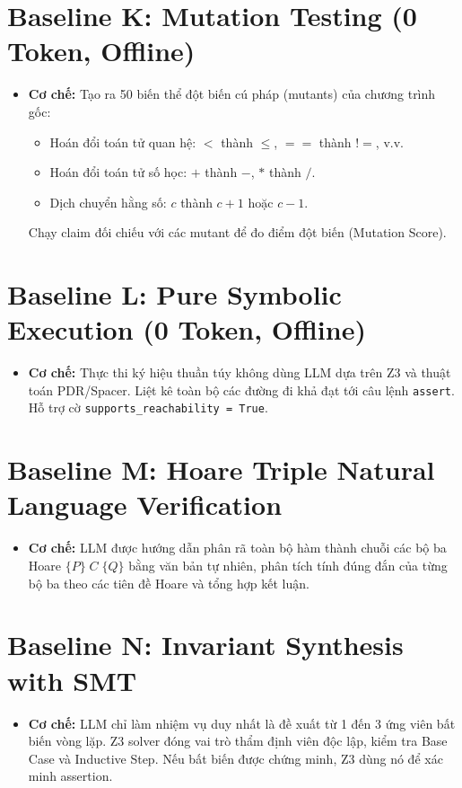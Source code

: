 \section{Baseline K: Mutation Testing (0 Token, Offline)}
\begin{itemize}
    \item \textbf{Cơ chế:} Tạo ra 50 biến thể đột biến cú pháp (mutants) của chương trình gốc:
    \begin{itemize}
        \item Hoán đổi toán tử quan hệ: $<$ thành $\le$, $==$ thành $!=$, v.v.
        \item Hoán đổi toán tử số học: $+$ thành $-$, $*$ thành $/$.
        \item Dịch chuyển hằng số: $c$ thành $c + 1$ hoặc $c - 1$.
    \end{itemize}
    Chạy claim đối chiếu với các mutant để đo điểm đột biến (Mutation Score).
\end{itemize}

\section{Baseline L: Pure Symbolic Execution (0 Token, Offline)}
\begin{itemize}
    \item \textbf{Cơ chế:} Thực thi ký hiệu thuần túy không dùng LLM dựa trên Z3 và thuật toán PDR/Spacer. Liệt kê toàn bộ các đường đi khả đạt tới câu lệnh \texttt{assert}. Hỗ trợ cờ \texttt{supports\_reachability = True}.
\end{itemize}

\section{Baseline M: Hoare Triple Natural Language Verification}
\begin{itemize}
    \item \textbf{Cơ chế:} LLM được hướng dẫn phân rã toàn bộ hàm thành chuỗi các bộ ba Hoare $\{P\} \; C \; \{Q\}$ bằng văn bản tự nhiên, phân tích tính đúng đắn của từng bộ ba theo các tiên đề Hoare và tổng hợp kết luận.
\end{itemize}

\section{Baseline N: Invariant Synthesis with SMT}
\begin{itemize}
    \item \textbf{Cơ chế:} LLM chỉ làm nhiệm vụ duy nhất là đề xuất từ 1 đến 3 ứng viên bất biến vòng lặp. Z3 solver đóng vai trò thẩm định viên độc lập, kiểm tra Base Case và Inductive Step. Nếu bất biến được chứng minh, Z3 dùng nó để xác minh assertion.
\end{itemize}

